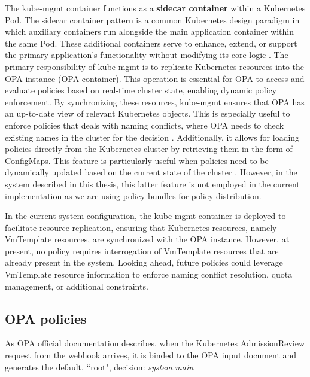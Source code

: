 The kube-mgmt container functions as a \textbf{sidecar container} within a Kubernetes Pod. The sidecar container pattern is a common Kubernetes design paradigm in which auxiliary containers run alongside the main application container within the same Pod. These additional containers serve to enhance, extend, or support the primary application's functionality without modifying its core logic \cite{sidecar_containers}. 
The primary responsibility of kube-mgmt is to replicate Kubernetes resources into the OPA instance (OPA container). This operation is essential for OPA to access and evaluate policies based on real-time cluster state, enabling dynamic policy enforcement. By synchronizing these resources, kube-mgmt ensures that OPA has an up-to-date view of relevant Kubernetes objects.
This is especially useful to enforce policies that deals with naming conflicts, where OPA needs to check existing names in the cluster for the decision \cite{kube-mgmt}.
Additionally, it allows for loading policies directly from the Kubernetes cluster by retrieving them in the form of ConfigMaps. This feature is particularly useful when policies need to be dynamically updated based on the current state of the cluster \cite{kube-mgmt}. However, in the system described in this thesis, this latter feature is not employed in the current implementation as we are using policy bundles for policy distribution.

In the current system configuration, the kube-mgmt container is deployed to facilitate resource replication, ensuring that Kubernetes resources, namely VmTemplate resources, are synchronized with the OPA instance. However, at present, no policy requires interrogation of VmTemplate resources that are already present in the system.
Looking ahead, future policies could leverage VmTemplate resource information to enforce naming conflict resolution, quota management, or additional constraints.

\newpage




\subsection{OPA policies}
\label{sec:opa_policies}






As OPA official documentation describes, when the Kubernetes AdmissionReview request from the webhook arrives, it is binded to the OPA input document and generates the default, ``root", decision: \textit{system.main}

